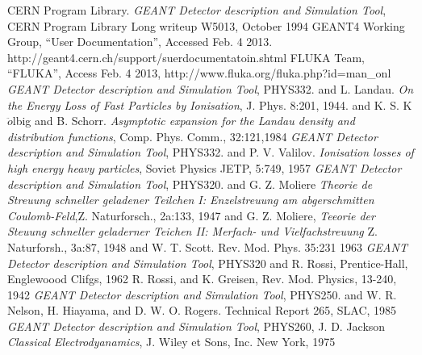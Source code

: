 %
\begin{thebibliography}{99}
 CERN Program Library. 
         \textsl{GEANT Detector description and Simulation Tool},
         CERN Program Library Long writeup W5013, October 1994
 GEANT4 Working Group, ``User Documentation'',
                 Accessed Feb. 4 2013. 
                 http://geant4.cern.ch/support/suerdocumentatoin.shtml
  FLUKA Team, ``FLUKA'', Access Feb. 4 2013,
                 http://www.fluka.org/fluka.php?id=man\_onl
 \textsl{GEANT Detector description and Simulation Tool},
                      PHYS332. and
                      L. Landau. \textsl{On the Energy Loss of Fast Particles 
                      by Ionisation}, J. Phys. 8:201, 1944. and
                      K. S. K$\ddot{o}$lbig and B. Schorr. \textsl{Asymptotic 
                      expansion for the Landau density and distribution 
                      functions}, Comp. Phys. Comm., 32:121,1984
\textsl{GEANT Detector description and Simulation Tool},
                       PHYS332. and 
                       P. V. Valilov. \textsl{Ionisation losses of high 
                       energy heavy particles}, Soviet Physics 
                       JETP, 5:749, 1957
\textsl{GEANT Detector description and Simulation Tool},
                 PHYS320. and
                 G. Z. Moliere \textsl{Theorie de Streuung schneller 
                 geladener Teilchen I: Enzelstreuung am abgerschmitten 
                 Coulomb-Feld},Z. Naturforsch., 2a:133, 1947 and
                 G. Z. Moliere, \textsl{Teeorie der Steuung schneller 
                 geladerner Teichen II: Merfach- und Vielfachstreuung} 
                 Z. Naturforsh., 3a:87, 1948 and
                 W. T. Scott. Rev. Mod. Phys. 35:231 1963
\textsl{GEANT Detector description and Simulation Tool},
                 PHYS320 and
                 R. Rossi, Prentice-Hall, Englewoood Clifgs, 1962
                 R. Rossi, and K. Greisen, Rev. Mod. Physics, 13-240, 1942
 \textsl{GEANT Detector description and Simulation Tool},
                   PHYS250. and
                   W. R. Nelson, H. Hiayama, and D. W. O. Rogers. Technical 
                   Report 265, SLAC, 1985
 \textsl{GEANT Detector description and Simulation Tool},
                   PHYS260,
                   J. D. Jackson \textsl{Classical Electrodyanamics}, 
                   J. Wiley et Sons, Inc. New York, 1975
\end{thebibliography}
%
%
%
